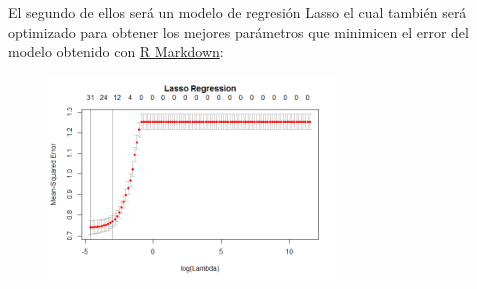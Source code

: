 \documentclass{article}
\begin{document}
\begin{figure}[h]
\centering
{}
\end{figure}

El segundo de ellos será un modelo de regresión Lasso\cite{glmnet} el cual también será optimizado para obtener los mejores parámetros que minimicen el error del modelo obtenido con \href{https://github.com/pozueco/proyecto_fin_de_master/blob/master/model_supervised.md}{R Markdown}:

\begin{figure}[h]
\centering
\includegraphics[width=3in,clip,keepaspectratio]{./model_supervised_files/figure-markdown_github/unnamed-chunk-7-1}
\end{figure}

\clearpage
\end{document}
